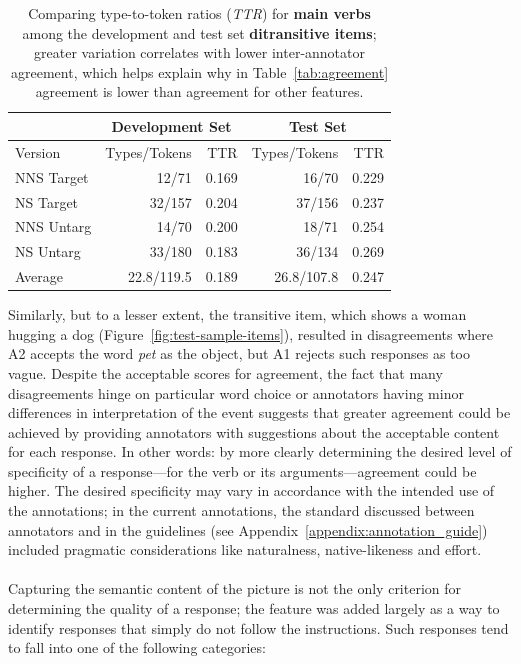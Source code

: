 \begin{table}[htb!]
\begin{center}
\begin{tabular}{|l||r|r||r|r|}
\hline
 & \multicolumn{2}{|c||}{Development Set} & \multicolumn{2}{|c|}{Test Set} \\
\hline
Version	& Types/Tokens & TTR & Types/Tokens & TTR \\
\hline
\hline
NNS Target & 12/71 & 0.169 & 16/70 & 0.229 \\
\hline
NS Target & 32/157 & 0.204 & 37/156 & 0.237 \\
\hline
NNS Untarg & 14/70 & 0.200 & 18/71 & 0.254 \\
\hline
NS Untarg & 33/180 & 0.183 & 36/134 & 0.269 \\
\hline
\hline
Average & 22.8/119.5 & 0.189 & 26.8/107.8 & 0.247 \\
\hline
\end{tabular}
\caption{\label{tab:pref-dev-vs-test} Comparing type-to-token ratios (\textit{TTR}) for \textbf{main verbs} among the development and test set \textbf{ditransitive items}; greater variation correlates with lower  inter-annotator agreement, which helps explain why in Table~\ref{tab:agreement}  agreement is lower than agreement for other features.}
\end{center}
\end{table}

Similarly, but to a lesser extent, the transitive item, which shows a woman hugging a dog (Figure~\ref{fig:test-sample-items}), resulted in disagreements where A2 accepts the word \textit{pet} as the object, but A1 rejects such responses as too vague. Despite the acceptable scores for  agreement, the fact that many disagreements hinge on particular word choice or annotators having minor differences in interpretation of the event suggests that greater agreement could be achieved by providing annotators with suggestions about the acceptable content for each response. In other words: by more clearly determining the desired level of specificity of a response---for the verb or its arguments---agreement could be higher. The desired specificity may vary in accordance with the intended use of the annotations; in the current annotations, the standard discussed between annotators and in the guidelines (see Appendix~\ref{appendix:annotation_guide}) included pragmatic considerations like naturalness, native-likeness and effort.

\paragraph{} Capturing the semantic content of the picture is not the only criterion for determining the quality of a response; the  feature was added largely as a way to identify responses that simply do not follow the instructions. Such responses tend to fall into one of the following categories:

